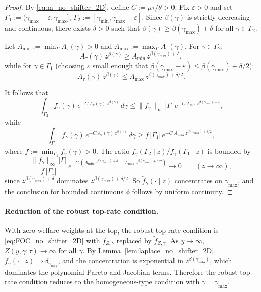\documentclass[12pt,a4paper]{article}
\theoremstyle{definition}
\theoremstyle{plain}
\theoremstyle{remark}
\begin{document}
\begin{proof}
By \eqref{eq:m_no_shifter_2D}, define $C := \mu\tau/\theta > 0$.  Fix $\varepsilon > 0$ and set $\Gamma_1 := (\gamma_{\max}-\varepsilon,\gamma_{\max}]$, $\Gamma_2 := [\gamma_{\min},\gamma_{\max}-\varepsilon]$.  Since $\beta(\gamma)$ is strictly decreasing and continuous, there exists $\delta > 0$ such that $\beta(\gamma) \geq \beta(\gamma_{\max}) + \delta$ for all $\gamma \in \Gamma_2$.

Let $A_{\min} := \min_{\Gamma} A_{\tau}(\gamma) > 0$ and $A_{\max} := \max_{\Gamma} A_{\tau}(\gamma)$.  For $\gamma \in \Gamma_2$:
\[
  A_{\tau}(\gamma)\,z^{\beta(\gamma)} \geq A_{\min}\,z^{\beta(\gamma_{\max})+\delta},
\]
while for $\gamma \in \Gamma_1$ (choosing $\varepsilon$ small enough that $\beta(\gamma_{\max}-\varepsilon) \leq \beta(\gamma_{\max}) + \delta/2$):
\[
  A_{\tau}(\gamma)\,z^{\beta(\gamma)} \leq A_{\max}\,z^{\beta(\gamma_{\max})+\delta/2}.
\]

It follows that
\[
  \int_{\Gamma_2} f_{\gamma}(\gamma)\,e^{-C\,A_{\tau}(\gamma)\,z^{\beta(\gamma)}}\,d\gamma \leq \|f_{\gamma}\|_{\infty}\,|\Gamma|\,e^{-C\,A_{\min}\,z^{\beta(\gamma_{\max})+\delta}},
\]
while
\[
  \int_{\Gamma_1} f_{\gamma}(\gamma)\,e^{-C\,A_{\tau}(\gamma)\,z^{\beta(\gamma)}}\,d\gamma \geq \underline{f}\,|\Gamma_1|\,e^{-C\,A_{\max}\,z^{\beta(\gamma_{\max})+\delta/2}},
\]
where $\underline{f} := \min_{\Gamma_1} f_{\gamma}(\gamma) > 0$.  The ratio $\widetilde{f}_{\gamma}(\Gamma_2 \mid z) / \widetilde{f}_{\gamma}(\Gamma_1 \mid z)$ is bounded by
\[
  \frac{\|f_{\gamma}\|_{\infty}\,|\Gamma|}{\underline{f}\,|\Gamma_1|}\,e^{-C\,(A_{\min}\,z^{\beta(\gamma_{\max})+\delta} - A_{\max}\,z^{\beta(\gamma_{\max})+\delta/2})} \to 0 \qquad (z \to \infty),
\]
since $z^{\beta(\gamma_{\max})+\delta}$ dominates $z^{\beta(\gamma_{\max})+\delta/2}$.  So $\widetilde{f}_{\gamma}(\cdot \mid z)$ concentrates on $\gamma_{\max}$, and the conclusion for bounded continuous $\phi$ follows by uniform continuity.
\end{proof}

\paragraph{Reduction of the robust top-rate condition.}

With zero welfare weights at the top, the robust top-rate condition is \eqref{eq:FOC_no_shifter_2D} with $f_{Z,\gamma}$ replaced by $\widetilde{f}_{Z,\gamma}$.  As $y \to \infty$, $Z(y,\gamma;\tau) \to \infty$ for all $\gamma$.  By Lemma~\ref{lem:laplace_no_shifter_2D}, $\widetilde{f}_{\gamma}(\cdot \mid z) \Rightarrow \delta_{\gamma_{\max}}$, and the concentration is exponential in $z^{\beta(\gamma_{\max})}$, which dominates the polynomial Pareto and Jacobian terms.  Therefore the robust top-rate condition reduces to the homogeneous-type condition with $\gamma = \gamma_{\max}$.
\end{document}
